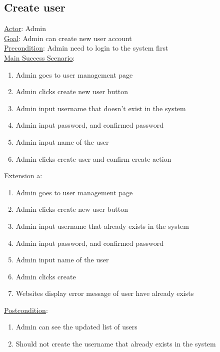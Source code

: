 \documentclass[12pt,oneside,openright,a4paper]{cpe-english-project}
\begin{document}
\subsection{Create user}
\underline{Actor}: Admin\\
\underline{Goal}: Admin can create new user account\\
\underline{Precondition}: Admin need to login to the system first\\
\underline{Main Success Scenario}:
\begin{enumerate}[label={\arabic*.}]
	\item Admin goes to user management page
	\item Admin clicks create new user button
	\item Admin input username that doesn’t exist in the system
	\item Admin input password, and confirmed password
	\item Admin input name of the user
	\item Admin clicks create user and confirm create action
\end{enumerate}
\underline{Extension a}:
\begin{enumerate}[label={\arabic*.}]
	\item Admin goes to user management page
	\item Admin clicks create new user button
	\item Admin input username that already exists in the system
	\item Admin input password, and confirmed password
	\item Admin input name of the user
	\item Admin clicks create
	\item Websites display error message of user have already exists
\end{enumerate}
\underline{Postcondition}: 
\begin{enumerate}[label={\arabic*.}]
	\item Admin can see the updated list of users
	\item Should not create the username that already exists in the system
\end{enumerate}
\end{document}
